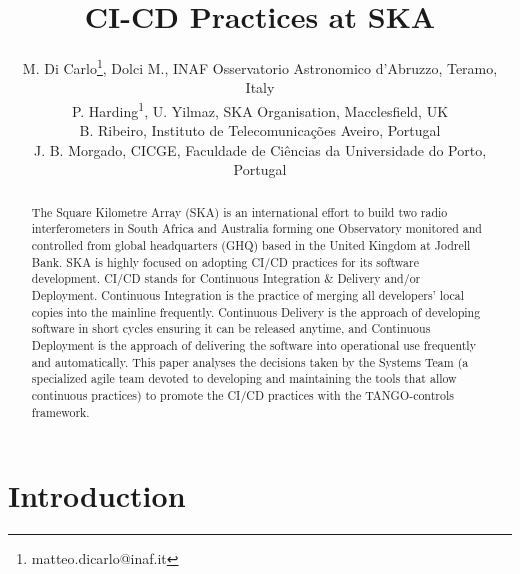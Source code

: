 \documentclass[a4paper,
	       keeplastbox,   %
	       References
	       ]{jacow}
\begin{document}
\title{CI-CD Practices at SKA}

\author{M. Di Carlo\thanks{matteo.dicarlo@inaf.it}, Dolci M., INAF Osservatorio Astronomico d'Abruzzo, Teramo, Italy \\
	P. Harding\textsuperscript{1}, U. Yilmaz, SKA Organisation, Macclesfield, UK \\
	B. Ribeiro, Instituto de Telecomunicações Aveiro, Portugal \\
	J. B. Morgado, CICGE, Faculdade de Ciências da Universidade do Porto, Portugal}

\maketitle

\begin{abstract}
The Square Kilometre Array (SKA) is an international effort to build two radio interferometers in South Africa and Australia forming one Observatory monitored and controlled from global headquarters (GHQ) based in the United Kingdom at Jodrell Bank. SKA is highly focused on adopting CI/CD practices for its software development. CI/CD stands for Continuous Integration \& Delivery and/or Deployment. Continuous Integration is the practice of merging all developers' local copies into the mainline frequently. Continuous Delivery is the approach of developing software in short cycles ensuring it can be released anytime, and Continuous Deployment is the approach of delivering the software into operational use frequently and automatically. This paper analyses the decisions taken by the Systems Team (a specialized agile team devoted to developing and maintaining the tools that allow continuous practices) to promote the CI/CD practices with the TANGO-controls framework.
\end{abstract}

\section{Introduction}
\label{sec:intro}  %
\end{document}
